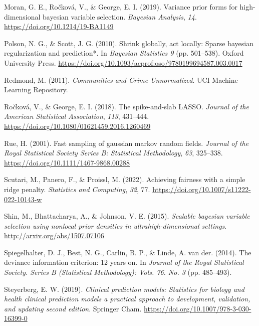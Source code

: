 \documentclass[
  11pt,
]{article}
\newlength{\cslhangindent}
\newlength{\cslentryspacingunit} %
\newenvironment{CSLReferences}[2] %
 {%
  \setlength{\parindent}{0pt}
  \ifodd #1
  \let\oldpar\par
  \def\par{\hangindent=\cslhangindent\oldpar}
  \fi
  \setlength{\parskip}{#2\cslentryspacingunit}
 }%
 {}
\begin{document}
\begin{CSLReferences}{1}{0}
\leavevmode{}%
Moran, G. E., Ročková, V., \& George, E. I. (2019). Variance prior forms
for high-dimensional bayesian variable selection. \emph{Bayesian
Analysis}, \emph{14}. \url{https://doi.org/10.1214/19-BA1149}

\leavevmode{}%
Polson, N. G., \& Scott, J. G. (2010). Shrink globally, act locally:
Sparse bayesian regularization and prediction*. In \emph{Bayesian
Statistics 9} (pp. 501--538). Oxford University Press.
\url{https://doi.org/10.1093/acprof:oso/9780199694587.003.0017}

\leavevmode{}%
Redmond, M. (2011). \emph{{Communities and Crime Unnormalized}}. UCI
Machine Learning Repository.

\leavevmode{}%
Ročková, V., \& George, E. I. (2018). The spike-and-slab LASSO.
\emph{Journal of the American Statistical Association}, \emph{113},
431--444. \url{https://doi.org/10.1080/01621459.2016.1260469}

\leavevmode{}%
Rue, H. (2001). Fast sampling of gaussian markov random fields.
\emph{Journal of the Royal Statistical Society Series B: Statistical
Methodology}, \emph{63}, 325--338.
\url{https://doi.org/10.1111/1467-9868.00288}

\leavevmode{}%
Scutari, M., Panero, F., \& Proissl, M. (2022). Achieving fairness with
a simple ridge penalty. \emph{Statistics and Computing}, \emph{32}, 77.
\url{https://doi.org/10.1007/s11222-022-10143-w}

\leavevmode{}%
Shin, M., Bhattacharya, A., \& Johnson, V. E. (2015). \emph{Scalable
bayesian variable selection using nonlocal prior densities in
ultrahigh-dimensional settings}. \url{http://arxiv.org/abs/1507.07106}

\leavevmode{}%
Spiegelhalter, D. J., Best, N. G., Carlin, B. P., \& Linde, A. van der.
(2014). The deviance information criterion: 12 years on. In
\emph{Journal of the Royal Statistical Society. Series B (Statistical
Methodology): Vols. 76. No. 3} (pp. 485--493).

\leavevmode{}%
Steyerberg, E. W. (2019). \emph{Clinical prediction models: Statistics
for biology and health clinical prediction models a practical approach
to development, validation, and updating second edition}. Springer Cham.
\url{https://doi.org/10.1007/978-3-030-16399-0}


\end{CSLReferences}
\end{document}
